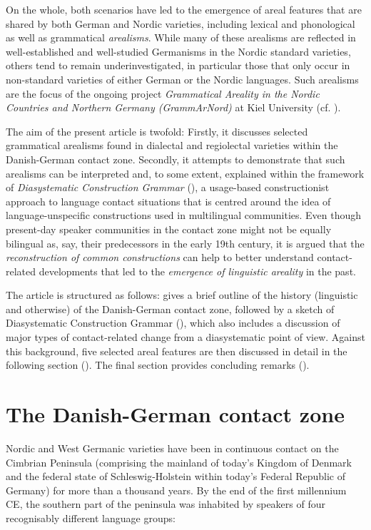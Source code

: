 \documentclass[output=paper]{langsci/langscibook}
\begin{document}
On the whole, both scenarios have led to the emergence of areal features that are shared by both German and Nordic varieties, including lexical and phonological as well as grammatical \textit{arealisms}. While many of these arealisms are reflected in well-established and well-studied Germanisms in the Nordic standard varieties, others tend to remain underinvestigated, in particular those that only occur in non-standard varieties of either German or the Nordic languages. Such arealisms are the focus of the ongoing project \textit{Grammatical Areality in the Nordic Countries and Northern Germany (GrammArNord)} at Kiel University (cf. \citealt{Hoder.2016a}).

The aim of the present article is twofold: Firstly, it discusses selected grammatical arealisms found in dialectal and regiolectal varieties within the Danish-German contact zone. Secondly, it attempts to demonstrate that such arealisms can be interpreted and, to some extent, explained within the framework of \textit{Diasystematic Construction Grammar} (\citealt{Hoder.2012, Hoder.2014, Hoder.2018}), a usage-based constructionist approach to language contact situations that is centred around the idea of language-unspecific constructions used in multilingual communities. Even though present-day speaker communities in the contact zone might not be equally bilingual as, say, their predecessors in the early 19th century, it is argued that the \textit{reconstruction of common constructions} can help to better understand contact-related developments that led to the \textit{emergence of linguistic areality} in the past.

The article is structured as follows:  gives a brief outline of the history (linguistic and otherwise) of the Danish-German contact zone, followed by a sketch of Diasystematic Construction Grammar (), which also includes a discussion of major types of contact-related change from a diasystematic point of view. Against this background, five selected areal features are then discussed in detail in the following section (). The final section provides concluding remarks ().


\section{The Danish-German contact zone}
\label{sec:hoeder:2}

Nordic and West Germanic varieties have been in continuous contact on the Cimbrian Peninsula (comprising the mainland of today’s Kingdom of Denmark and the federal state of Schleswig-Holstein within today’s Federal Republic of Germany) for more than a thousand years. By the end of the first millennium CE, the southern part of the peninsula was inhabited by speakers of four recognisably different language groups:
\end{document}
